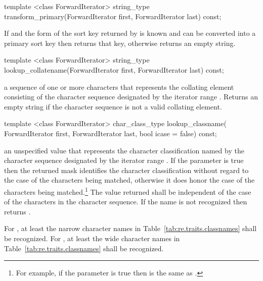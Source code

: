 %
\begin{itemdecl}
template <class ForwardIterator>
  string_type transform_primary(ForwardIterator first, ForwardIterator last) const; 
\end{itemdecl}

\begin{itemdescr}
\pnum\effects If 
and the form of the sort key returned
by  is known and
can be converted into a primary sort key then returns that key,
otherwise returns an empty string.
\end{itemdescr}

%
\begin{itemdecl}
template <class ForwardIterator>
  string_type lookup_collatename(ForwardIterator first, ForwardIterator last) const; 
\end{itemdecl}

\begin{itemdescr}
\pnum\returns  a sequence of one or more characters that
represents the collating element consisting of the character
sequence designated by the iterator range .
Returns an empty string if the character sequence is not a
valid collating element.
\end{itemdescr}

%
\begin{itemdecl}
template <class ForwardIterator>
  char_class_type lookup_classname(
    ForwardIterator first, ForwardIterator last, bool icase = false) const; 
\end{itemdecl}

\begin{itemdescr}
\pnum\returns  an unspecified value that represents
the character classification named by the character sequence
designated by the iterator range .
If the parameter  is true then the returned mask identifies the
character classification without regard to the case of the characters being
matched, otherwise it does honor the case of the characters being
matched.\footnote{For example, if the parameter  is true then
\tcode{[[:lower:]]} is the same as \tcode{[[:alpha:]]}.}
The value
returned shall be independent of the case of the characters in
the character sequence. If the name
is not recognized then returns .

\pnum
\remarks  For , at least the narrow character names
in Table~\ref{tab:re.traits.classnames} shall be recognized.
For , at least the wide character names
in Table~\ref{tab:re.traits.classnames} shall be recognized.
\end{itemdescr}

